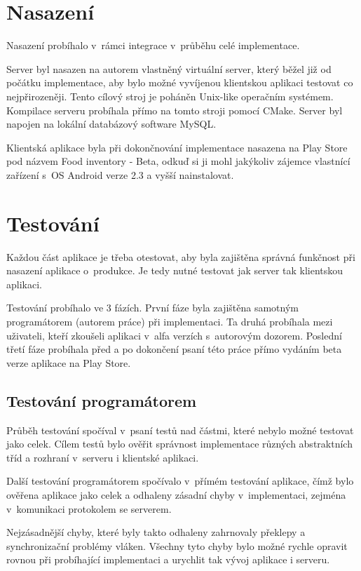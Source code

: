 \documentclass[thesis=B,czech]{FITthesis}[2013/10/20]
\begin{document}
\chapter{Nasazení}

Nasazení probíhalo v~rámci integrace v~průběhu celé implementace.

Server byl nasazen na autorem vlastněný virtuální server, který běžel již od počátku implementace, aby bylo možné vyvíjenou klientskou aplikaci testovat co nejpřirozeněji. Tento cílový stroj je poháněn Unix-like operačním systémem. Kompilace serveru probíhala přímo na tomto stroji pomocí CMake. Server byl napojen na lokální databázový software MySQL. 

Klientská aplikace byla při dokončnování implementace nasazena na Play Store pod názvem Food inventory - Beta, odkuď si ji mohl jakýkoliv zájemce vlastnící zařízení s~OS Android verze 2.3 a vyšší nainstalovat. 

\chapter{Testování}

Každou část aplikace je třeba otestovat, aby byla zajištěna správná funkčnost při nasazení aplikace o~produkce. Je tedy nutné testovat jak server tak klientskou aplikaci.

Testování probíhalo ve 3 fázích. První fáze byla zajištěna samotným programátorem (autorem práce) při implementaci. Ta druhá probíhala mezi uživateli, kteří zkoušeli aplikaci v~alfa verzích s~autorovým dozorem. Poslední třetí fáze probíhala před a po dokončení psaní této práce přímo vydáním beta verze aplikace na Play Store.

\section{Testování programátorem}

Průběh testování spočíval v~psaní testů nad částmi, které nebylo možné testovat jako celek. Cílem testů bylo ověřit správnost implementace různých abstraktních tříd a rozhraní v~serveru i klientské aplikaci.

Další testování programátorem spočívalo v~přímém testování aplikace, čímž bylo ověřena aplikace jako celek a odhaleny zásadní chyby v~implementaci, zejména v~komunikaci protokolem se serverem.

Nejzásadnější chyby, které byly takto odhaleny zahrnovaly překlepy a synchronizační problémy vláken. Všechny tyto chyby bylo možné rychle opravit rovnou při probíhající implementaci a urychlit tak vývoj aplikace i serveru.
\end{document}

